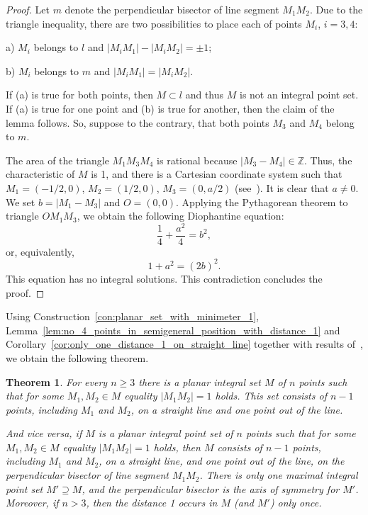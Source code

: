 \documentclass[a4paper,14pt]{article} %
\theoremstyle{plain}
\newtheorem{theorem}{Theorem}[section]
\theoremstyle{definition}
\begin{document}
\begin{proof}
	Let $m$ denote the perpendicular bisector of line segment $M_1 M_2$.
	Due to the triangle inequality, there are two possibilities to place each of points $M_i$, $i=3,4$:

	a) $M_i$ belongs to $l$ and $|M_i M_1|-|M_i M_2| = \pm 1$;

	b) $M_i$ belongs to $m$ and $|M_i M_1| = |M_i M_2|$.

	If (a) is true for both points, then $M\subset l$ and thus $M$ is not an integral point set.
	If (a) is true for one point and (b) is true for another, then the claim of the lemma follows.
	So, suppose to the contrary, that both points $M_3$ and $M_4$ belong to $m$.

	The area of the triangle $M_1 M_3 M_4$ is rational because $|M_3 - M_4| \in \mathbb{Z}$.
	Thus, the characteristic of $M$ is 1,
	and there is a Cartesian coordinate system such that $M_1=(-1/2,0)$, $M_2=(1/2,0)$, $M_3=(0, a/2)$
	(see~\cite[Theorem 4]{our-vmmsh-2018}).
	It is clear that $a\neq 0$.
	We set $b = |M_1 - M_3|$ and $O=(0,0)$.
	Applying the Pythagorean theorem to triangle $OM_1M_3$, we obtain the following Diophantine equation:
	\begin{equation}
		\frac{1}{4} + \frac{a^2}{4} = b^2
		,
	\end{equation}
	or, equivalently,
	\begin{equation}
		1 + a^2 = (2b)^2
		.
	\end{equation}
	This equation has no integral solutions.
	This contradiction concludes the proof.
\end{proof}

Using Construction~\ref{con:planar_set_with_minimeter_1},
Lemma~\ref{lem:no_4_points_in_semigeneral_position_with_distance_1} and Corollary~\ref{cor:only_one_distance_1_on_straight_line}
together with results of~\cite[Section 6]{antonov2008maximal},
we obtain the following theorem.

\begin{theorem}
	\label{thm:minimeter_1_planar}
	For every $n\geq 3$ there is a planar integral set $M$ of $n$ points
	such that for some $M_1,M_2 \in M$ equality $|M_1 M_2|=1$ holds.
	This set consists of $n-1$ points, including $M_1$ and $M_2$, on a straight line and one point out of the line.

	And vice versa, if $M$ is a planar integral point set of $n$ points
	such that for some $M_1,M_2 \in M$ equality $|M_1 M_2|=1$ holds,
	then $M$ consists of $n-1$ points, including $M_1$ and $M_2$, on a straight line,
	and one point out of the line, on the perpendicular bisector of line segment $M_1 M_2$.
	There is only one maximal integral point set $M' \supseteq M$,
	and the perpendicular bisector is the axis of symmetry for $M'$.
	Moreover, if $n > 3$, then the distance 1 occurs in $M$ (and $M'$) only once.
\end{theorem}
\end{document}
